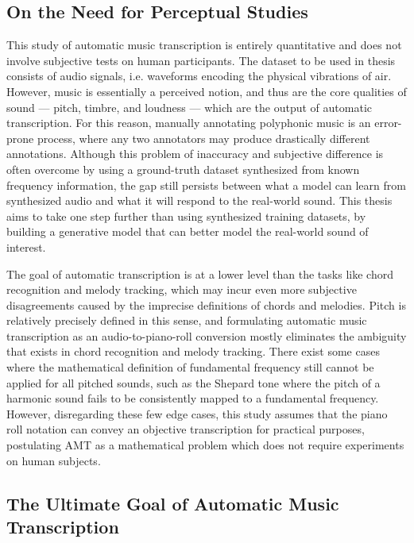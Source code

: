 \subsection{On the Need for Perceptual Studies}

This study of automatic music transcription is entirely quantitative and does not involve subjective tests on human participants.
The dataset to be used in thesis consists of audio signals, i.e. waveforms encoding the physical vibrations of air.
However, music is essentially a perceived notion, and thus are the core qualities of sound --- pitch, timbre, and loudness --- which are the output of automatic transcription.
For this reason, manually annotating polyphonic music is an error-prone process, where any two annotators may produce drastically different annotations.
Although this problem of inaccuracy and subjective difference is often overcome by using a ground-truth dataset synthesized from known frequency information, the gap still persists between what a model can learn from synthesized audio and what it will respond to the real-world sound.
This thesis aims to take one step further than using synthesized training datasets, by building a generative model that can better model the real-world sound of interest.

The goal of automatic transcription is at a lower level than the tasks like chord recognition and melody tracking, which may incur even more subjective disagreements caused by the imprecise definitions of chords and melodies.
Pitch is relatively precisely defined in this sense, and formulating automatic music transcription as an audio-to-piano-roll conversion mostly eliminates the ambiguity that exists in chord recognition and melody tracking.
There exist some cases where the mathematical definition of fundamental frequency still cannot be applied for all pitched sounds, such as the Shepard tone \cite{shepard1964circularity} where the pitch of a harmonic sound fails to be consistently mapped to a fundamental frequency.
However, disregarding these few edge cases, this study assumes that the piano roll notation can convey an objective transcription for practical purposes, postulating AMT as a mathematical problem which does not require experiments on human subjects.


\subsection{The Ultimate Goal of Automatic Music Transcription}

